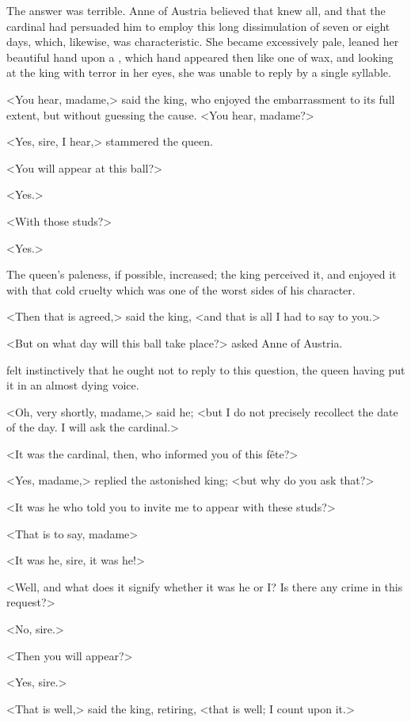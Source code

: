 The answer was terrible. Anne of Austria believed that  knew all, and that the cardinal had persuaded him to employ this long dissimulation of seven or eight days, which, likewise, was characteristic. She became excessively pale, leaned her beautiful hand upon a , which hand appeared then like one of wax, and looking at the king with terror in her eyes, she was unable to reply by a single syllable. 

<You hear, madame,> said the king, who enjoyed the embarrassment to its full extent, but without guessing the cause. <You hear, madame?> 

<Yes, sire, I hear,> stammered the queen. 

<You will appear at this ball?> 

<Yes.> 

<With those studs?> 

<Yes.> 

The queen's paleness, if possible, increased; the king perceived it, and enjoyed it with that cold cruelty which was one of the worst sides of his character. 

<Then that is agreed,> said the king, <and that is all I had to say to you.> 

<But on what day will this ball take place?> asked Anne of Austria. 

 felt instinctively that he ought not to reply to this question, the queen having put it in an almost dying voice. 

<Oh, very shortly, madame,> said he; <but I do not precisely recollect the date of the day. I will ask the cardinal.> 

<It was the cardinal, then, who informed you of this fête?> 

<Yes, madame,> replied the astonished king; <but why do you ask that?> 

<It was he who told you to invite me to appear with these studs?> 

<That is to say, madame\longdash> 

<It was he, sire, it was he!> 

<Well, and what does it signify whether it was he or I? Is there any crime in this request?> 

<No, sire.> 

<Then you will appear?> 

<Yes, sire.> 

<That is well,> said the king, retiring, <that is well; I count upon it.> 

